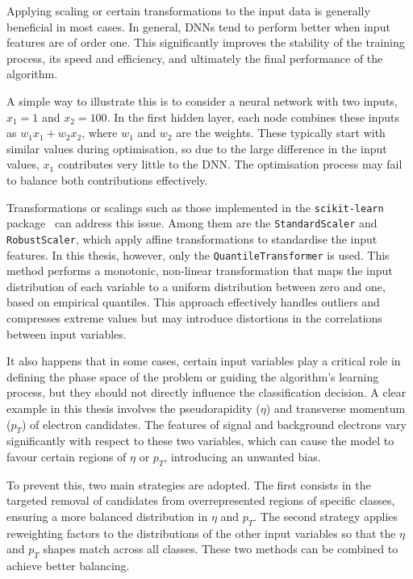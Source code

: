 Applying scaling or certain transformations to the input data is generally beneficial in most cases. In general, DNNs tend to perform better when input features are of order one. This significantly improves the stability of the training process, its speed and efficiency, and ultimately the final performance of the algorithm.

A simple way to illustrate this is to consider a neural network with two inputs, $x_{1}=1$ and $x_{2}=100$. In the first hidden layer, each node combines these inputs as $w_{1}x_{1} + w_{2}x_{2}$, where $w_{1}$ and $w_{2}$ are the weights. These typically start with similar values during optimisation, so due to the large difference in the input values, $x_{1}$ contributes very little to the DNN. The optimisation process may fail to balance both contributions effectively.

Transformations or scalings such as those implemented in the \texttt{scikit-learn} package~\cite{scikitlearn} can address this issue. Among them are the \texttt{StandardScaler} and \texttt{RobustScaler}, which apply affine transformations to standardise the input features. In this thesis, however, only the \texttt{QuantileTransformer} is used. This method performs a monotonic, non-linear transformation that maps the input distribution of each variable to a uniform distribution between zero and one, based on empirical quantiles. This approach effectively handles outliers and compresses extreme values but may introduce distortions in the correlations between input variables.

It also happens that in some cases, certain input variables play a critical role in defining the phase space of the problem or guiding the algorithm’s learning process, but they should not directly influence the classification decision. A clear example in this thesis involves the pseudorapidity ($\eta$) and transverse momentum ($p_{T}$) of electron candidates. The features of signal and background electrons vary significantly with respect to these two variables, which can cause the model to favour certain regions of $\eta$ or $p_{T}$, introducing an unwanted bias.

To prevent this, two main strategies are adopted. The first consists in the targeted removal of candidates from overrepresented regions of specific classes, ensuring a more balanced distribution in $\eta$ and $p_{T}$. The second strategy applies reweighting factors to the distributions of the other input variables so that the $\eta$ and $p_{T}$ shapes match across all classes. These two methods can be combined to achieve better balancing.

